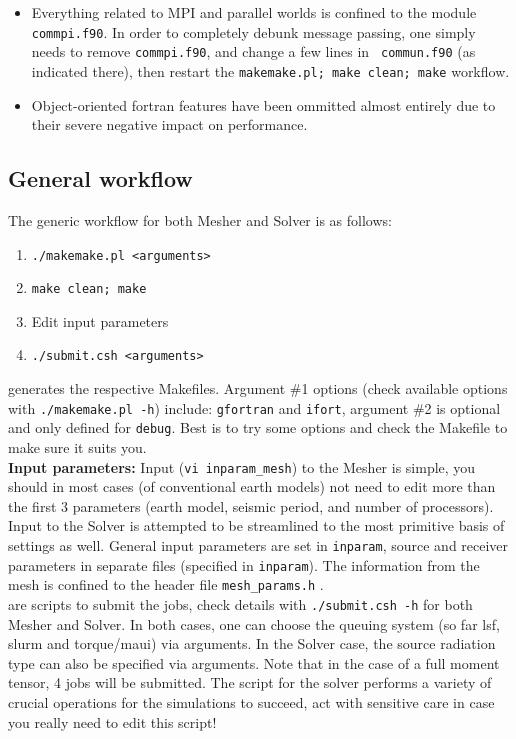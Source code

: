 \documentclass[11pt,letter,fleqn,english,notitlepage]{article}
\begin{document}
\begin{itemize}
    \item Everything related to MPI and parallel worlds is confined to the
    module {\tt commpi.f90}. In order to completely debunk message passing, one
    simply needs to remove {\tt commpi.f90}, and change a few lines in {\tt
    commun.f90} (as indicated there), then restart the {\tt makemake.pl; make
    clean; make} workflow. 

    \item Object-oriented fortran features have been ommitted almost entirely
    due to their severe negative impact on performance.
\end{itemize}

\subsection{General workflow}
The generic workflow for both Mesher and Solver is as follows:
\begin{enumerate}
    \item {\tt ./makemake.pl <arguments>}
    \item {\tt make clean; make}
    \item Edit input parameters
    \item {\tt ./submit.csh <arguments>}
\end{enumerate}

 generates the respective Makefiles. Argument \#1 options 
(check available options with {\tt ./makemake.pl -h}) include:
{\tt gfortran} and {\tt ifort}, argument \#2 is optional and only defined for
{\tt debug}. Best is to try some options and check the Makefile to make sure it suits you.\\

\noindent \textbf{Input parameters: } Input ({\tt vi inparam\_mesh}) to the
Mesher is simple, you should in most cases (of conventional earth models) not
need to edit more than the first 3 parameters (earth model, seismic period, and
number of processors).  Input to the Solver is attempted to be streamlined to
the most primitive basis of settings as well. General input parameters are set
in {\tt inparam}, source and receiver parameters in separate files (specified
in {\tt inparam}). The information from the mesh is confined to the header file
{\tt mesh\_params.h} .\\

 are scripts to submit the jobs, check details with
{\tt ./submit.csh -h} for both Mesher and Solver. In both cases, one can
choose the queuing system (so far lsf, slurm and torque/maui) via arguments. In the
Solver case, the source radiation type can also be specified via arguments.
Note that in the case of a full moment tensor, 4 jobs will be submitted.
The script for the solver performs a variety
of crucial operations for the simulations to succeed, act with sensitive care
in case you really need to edit this script! \\
\end{document}
